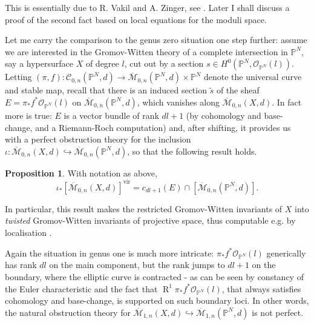 \documentclass[11pt]{amsart}
\newcommand{\M}[4]{\overline{\mathcal{M}}_{#1,#2}(#3,#4)}
\newcommand{\PP}{\mathbb P}
\newcommand{\OO}{\mathcal{O}}
\renewcommand{\to}{\rightarrow}
\newcommand{\virt}[1]{[#1]^{\mathrm{vir}}}
\theoremstyle{definition}
\newtheorem{prop}[thm]{Proposition}
\theoremstyle{definition}
\begin{document}
This is essentially due to R. Vakil and A. Zinger, see \cite[Lemma~5.9]{Vre} \cite[\S 1.2]{VZ}. Later I shall discuss a proof of the second fact based on local equations for the moduli space.

Let me carry the comparison to the genus zero situation one step further: assume we are interested in the Gromov-Witten theory of a complete intersection in $\PP^N$, say a hypersurface $X$ of degree $l$, cut out by a section $s\in H^0(\PP^N,\OO_{\PP^N}(l))$. Letting $(\pi,f)\colon \mathcal C_{0,n}(\PP^N,d) \to \M{0}{n}{\PP^N}{d}\times \PP^N$ denote the universal curve and stable map, recall that there is an induced section $\tilde{s}$ of the sheaf $E=\pi_*f^*\OO_{\PP^N}(l)$ on $\M{0}{n}{\PP^N}{d}$, which vanishes along $\M{0}{n}{X}{d}$. In fact more is true: $E$ is a vector bundle of rank $dl+1$ (by cohomology and base-change, and a Riemann-Roch computation) and, after shifting, it provides us with a perfect obstruction theory for the inclusion $\iota\colon \M{0}{n}{X}{d}\hookrightarrow\M{0}{n}{\PP^N}{d}$, so that the following result holds.

\begin{prop}\cite{CKL,KKP}
 With notation as above,
 \[\iota_*\virt{\M{0}{n}{X}{d}}=c_{dl+1}(E)\cap [\M{0}{n}{\PP^N}{d}].\]
\end{prop}
In particular, this result makes the restricted Gromov-Witten invariants of $X$ into \emph{twisted} Gromov-Witten invariants of projective space, thus computable e.g. by localisation \cite{Kon}.

Again the situation in genus one is much more intricate: $\pi_*f^*\OO_{\PP^N}(l)$ generically has rank $dl$ on the main component, but the rank jumps to $dl+1$ on the boundary, where the elliptic curve is contracted - as can be seen by constancy of the Euler characteristic and the fact that $\operatorname{R}^1\pi_*f^*\OO_{\PP^N}(l)$, that always satisfies cohomology and base-change, is supported on such boundary loci. In other words, the natural obstruction theory for $\M{1}{n}{X}{d}\hookrightarrow\M{1}{n}{\PP^N}{d}$ is not perfect.
\end{document}
